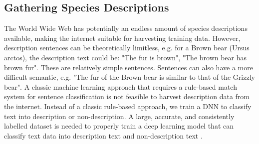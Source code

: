 \documentclass[a4paper, 12pt, oneside]{book} %
\begin{document}
\subsection{Gathering Species Descriptions} \label{par:dataset}
The World Wide Web has potentially an endless amount of species descriptions available, making the internet suitable for harvesting training data.
However, description sentences can be theoretically limitless, e.g. for a Brown bear (Ursus arctos), the description text could be: "The fur is brown", "The brown bear has brown fur".
These are relatively simple sentences.
Sentences can also have a more difficult semantic, e.g. "The fur of the Brown bear is similar to that of the Grizzly bear".
A classic machine learning approach that requires a rule-based match system for sentence classification is not feasible to harvest description data from the internet.
Instead of a classic rule-based approach, we train a DNN to classify text into description or non-description.
A large, accurate, and consistently labelled dataset is needed to properly train a deep learning model that can classify text data into description text and non-description text \autocite{munappy_data_2019, minaee_deep_2021}.
\end{document}
